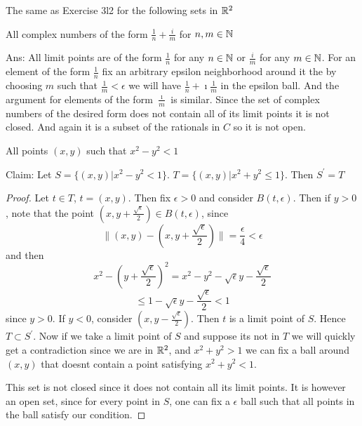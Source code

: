     \question 
    The same as Exercise 3l2 for the following sets in $\mathbb{R}^2$ 

    \begin{alphaparts}
        \questionpart 
        All complex numbers of the form $\frac{1}{n} + \frac{i}{m}$ for $n, m \in \mathbb{N}$ 

        Ans: 
        All limit points are of the form $\frac{1}{n}$ for any $n \in \mathbb{N}$ or $\frac{i}{m}$ for any $m \in \mathbb{N}$. 
        For an element of the form $\frac{1}{n}$ fix an arbitrary epsilon neighborhood around it the by choosing $m$ such that 
        $\frac{1}{m} < \epsilon$ we will have $\frac{1}{n} + \imath \frac{1}{m}$ in the epsilon ball. And the argument for 
        elements of the form $\frac{\imath}{m}$ is similar. Since the set of complex numbers of the desired form does not contain all of 
        its limit points it is not closed. And again it is a subset of the rationals in $C$ so it is not open. 
        
        \questionpart
        All points $(x, y) $ such that $x^2 - y^2 < 1$ 

        Claim: Let $S = \{(x, y) | x^2 - y^2 < 1\}$. 
         $T = \{(x, y) | x^2 + y^2 \leq 1\}$.
         Then $S^\prime = T$


         \begin{proof}
            Let $t \in T$, $t = (x, y)$. Then fix $\epsilon > 0$ and consider $B(t, \epsilon)$. 
            Then if $y > 0$, note that the point $(x, y + \frac{\sqrt{\epsilon}}{2}) \in B(t, \epsilon)$, 
            since 
            \[ \| (x, y) - (x, y + \frac{\sqrt{\epsilon}}{2}) \| = \frac{\epsilon}{4} < \epsilon \]
            and then 
            \[x^2 - (y + \frac{\sqrt{\epsilon}}{2})^2 = x^2 - y^2 - \sqrt{\epsilon}y - \frac{\sqrt{\epsilon}}{2}\]
            \[\leq 1 - \sqrt{\epsilon}y - \frac{\sqrt{\epsilon}}{2} < 1\]
            since $y > 0$. If $y < 0$, consider $(x, y - \frac{\sqrt{\epsilon}}{2})$. 
            Then $t$ is a limit point of $S$. Hence $T \subset S^\prime$. 
            Now if we take a limit point of $S$ and suppose its not in $T$ we will quickly get a contradiction 
            since we are in $\mathbb{R}^2$, and $x^2 + y^2 > 1$ we can fix a ball around $(x, y)$ that doesnt contain a point 
            satisfying $x^2 + y^2 < 1$. 

            This set is not closed since it does not contain all its limit points. It is however an open set, 
            since for every point in $S$, one can fix a $\epsilon$ ball such that all points in the ball satisfy our condition. 


\end{proof}
\end{alphaparts}
